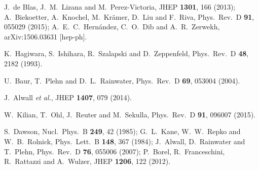  J.~de Blas, J.~M.~Lizana and M.~Perez-Victoria,
  JHEP {\bf 1301}, 166 (2013);
  A.~Biekoetter, A.~Knochel, M.~Kr\"amer, D.~Liu and F.~Riva,
  Phys.\ Rev.\ D {\bf 91}, 055029 (2015);
  A.~E.~C.~Hern\'andez, C.~O.~Dib and A.~R.~Zerwekh,
  arXiv:1506.03631 [hep-ph].

  K.~Hagiwara, S.~Ishihara, R.~Szalapski and D.~Zeppenfeld,
  Phys.\ Rev.\ D {\bf 48}, 2182 (1993).
  
  U.~Baur, T.~Plehn and D.~L.~Rainwater,
  Phys.\ Rev.\ D {\bf 69}, 053004 (2004).
 
  J.~Alwall {\it et al.},
  JHEP {\bf 1407}, 079 (2014).

  W.~Kilian, T.~Ohl, J.~Reuter and M.~Sekulla,
  Phys.\ Rev.\ D {\bf 91}, 096007 (2015).

  S.~Dawson,
  Nucl.\ Phys.\ B {\bf 249}, 42 (1985);
  G.~L.~Kane, W.~W.~Repko and W.~B.~Rolnick,
  Phys.\ Lett.\ B {\bf 148}, 367 (1984);
  J.~Alwall, D.~Rainwater and T.~Plehn,
  Phys.\ Rev.\ D {\bf 76}, 055006 (2007);
  P.~Borel, R.~Franceschini, R.~Rattazzi and A.~Wulzer,
  JHEP {\bf 1206}, 122 (2012).

